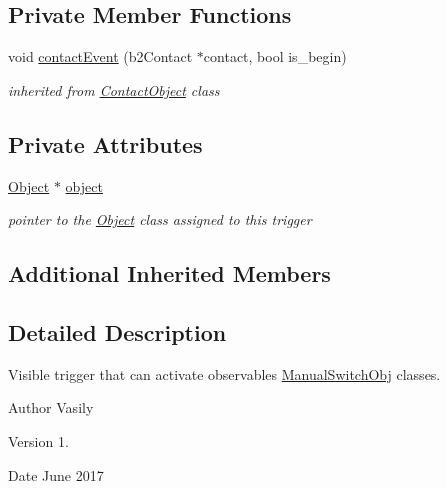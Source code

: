 \subsection*{Private Member Functions}
\begin{DoxyCompactItemize}
\item 
\mbox{\label{class_visible_sensor_a33adba65182352abad1f71646b9ecfa5}} 
void \hyperlink{class_visible_sensor_a33adba65182352abad1f71646b9ecfa5}{contact\+Event} (b2\+Contact $\ast$contact, bool is\+\_\+begin)
\begin{DoxyCompactList}\small\item\em inherited from \hyperlink{class_contact_object}{Contact\+Object} class \end{DoxyCompactList}\end{DoxyCompactItemize}
\subsection*{Private Attributes}
\begin{DoxyCompactItemize}
\item 
\mbox{\label{class_visible_sensor_a933e07d2186c63f9333778a213dd0cd5}} 
\hyperlink{class_object}{Object} $\ast$ \hyperlink{class_visible_sensor_a933e07d2186c63f9333778a213dd0cd5}{object}
\begin{DoxyCompactList}\small\item\em pointer to the \hyperlink{class_object}{Object} class assigned to this trigger \end{DoxyCompactList}\end{DoxyCompactItemize}
\subsection*{Additional Inherited Members}


\subsection{Detailed Description}
Visible trigger that can activate observables \hyperlink{class_manual_switch_obj}{Manual\+Switch\+Obj} classes. 

\begin{DoxyAuthor}{Author}
Vasily 
\end{DoxyAuthor}
\begin{DoxyVersion}{Version}
1. 
\end{DoxyVersion}
\begin{DoxyDate}{Date}
June 2017 
\end{DoxyDate}


